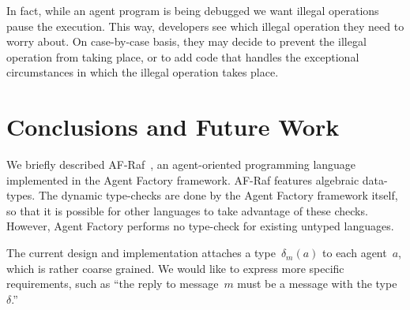 \documentclass{aamas2012} %
\theoremstyle{remark}
\begin{document}
In fact, while an agent program is being debugged we want illegal
operations pause the execution. This way, developers see which illegal
operation they need to worry about. On case-by-case basis, they may decide
to prevent the illegal operation from taking place, or to add code that
handles the exceptional circumstances in which the illegal operation takes
place.

%
%
\section{Conclusions and Future Work} \label{sec:conclusions} %

We briefly described AF-Raf~\cite{site:af-raf}, an agent-oriented
programming language implemented in the Agent Factory framework. AF-Raf
features algebraic data-types. The dynamic type-checks are done by the
Agent Factory framework itself, so that it is possible for other languages
to take advantage of these checks. However, Agent Factory performs no
type-check for existing untyped languages.

The current design and implementation attaches a type~$\delta_m(a)$ to each
agent~$a$, which is rather coarse grained. We would like to express more
specific requirements, such as ``the reply to message~$m$ must be a message
with the type~$\delta$.''
\end{document}
